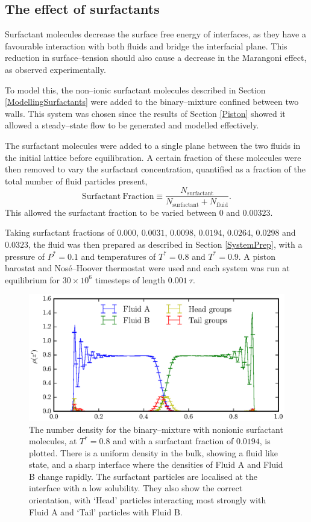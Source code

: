 \subsection{The effect of surfactants}
Surfactant molecules decrease the surface free energy of interfaces, as they have a favourable interaction with both fluids and bridge the interfacial plane.
This reduction in surface--tension should also cause a decrease in the Marangoni effect, as observed experimentally.\cite{KimSubramanianA,KimSubramanianB,BartonSubramanian,ChenStebe}

To model this, the non--ionic surfactant molecules described in Section \ref{ModellingSurfactants} were added to the binary--mixture confined between two walls.
This system was chosen since the results of Section \ref{Piston} showed it allowed a steady--state flow to be generated and modelled effectively.

The surfactant molecules were added to a single plane between the two fluids in the initial lattice before equilibration.
A certain fraction of these molecules were then removed to vary the surfactant concentration, quantified as a fraction of the total number of fluid particles present,
\begin{equation}
\mathrm{Surfactant\ Fraction} \equiv \frac{N_{\mathrm{surfactant}}}{N_{\mathrm{surfactant}}+N_{\mathrm{fluid}}}.
\end{equation}
This allowed the surfactant fraction to be varied between $0$ and $0.00323$.

Taking surfactant fractions of $0.000$, $0.0031$, $0.0098$, $0.0194$, $0.0264$, $0.0298$ and $0.0323$, the fluid was then prepared as described in Section \ref{SystemPrep}, with a pressure of $P^{*}=0.1$ and temperatures of $T^{*}=0.8$ and $T^{*}=0.9$.
A piston barostat and Nos\'{e}--Hoover thermostat were used and each system was run at equilibrium for $30 \times 10^{6}$ timesteps of length $0.001\ \tau$.

\begin{figure}[h]
\centering
\includegraphics[scale=0.8]{SurfRho}
\caption{The number density for the binary--mixture with nonionic surfactant molecules, at  $T^{*}=0.8$ and with a surfactant fraction of $0.0194$, is plotted.
There is a uniform density in the bulk, showing a fluid like state, and a sharp interface where the densities of Fluid A and Fluid B change rapidly.
The surfactant particles are localised at the interface with a low solubility.
They also show the correct orientation, with `Head' particles interacting most strongly with Fluid A and `Tail' particles with Fluid B.
}
\label{SurfRho}
\end{figure}

